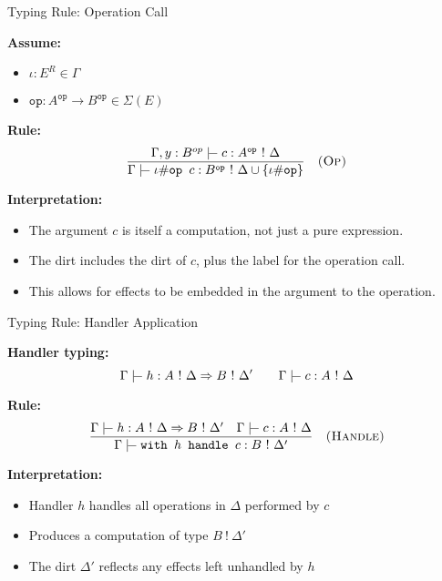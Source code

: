 \begin{frame}{Typing Rule: Operation Call }

\textbf{Assume:}
\begin{itemize}
  \item \( \iota : E^R \in \Gamma \)
  \item \( \texttt{op} : A^{\texttt{op}} \rightarrow B^{\texttt{op}} \in \Sigma(E) \)
\end{itemize}

\vspace{1em}

\textbf{Rule:}
\[
\frac{
  \Gamma, y: B^{op}  \tvdash c : A^{\texttt{op}} \ !\ \Delta
}{
  \Gamma\tvdash \iota \# \texttt{op } c : B^{\texttt{op}} \ !\ \Delta \cup \{ \iota \# \texttt{op} \}
}
\quad\textsc{(Op)}
\]

\vspace{1em}

\textbf{Interpretation:}
\begin{itemize}
  \item The argument \( c \) is itself a computation, not just a pure expression.
  \item The dirt includes the dirt of \( c \), plus the label for the operation call.
  \item This allows for effects to be embedded in the argument to the operation.
\end{itemize}

\end{frame}

\begin{frame}{Typing Rule: Handler Application}

\textbf{Handler typing:}
\[
\Gamma \tvdash h : A\ !\ \Delta \Rightarrow B\ !\ \Delta'
\qquad
\Gamma \tvdash c : A\ !\ \Delta
\]

\textbf{Rule:}
\[
\frac{
  \Gamma \tvdash h : A\ !\ \Delta \Rightarrow B\ !\ \Delta'
  \quad
  \Gamma \tvdash c : A\ !\ \Delta
}{
  \Gamma \tvdash \texttt{with } h \texttt{ handle } c : B\ !\ \Delta'
}
\quad\textsc{(Handle)}
\]

\vspace{1em}

\textbf{Interpretation:}
\begin{itemize}
  \item Handler \( h \) handles all operations in \( \Delta \) performed by \( c \)
  \item Produces a computation of type \( B\ !\ \Delta' \)
  \item The dirt \( \Delta' \) reflects any effects left unhandled by \( h \)
\end{itemize}

\end{frame}


